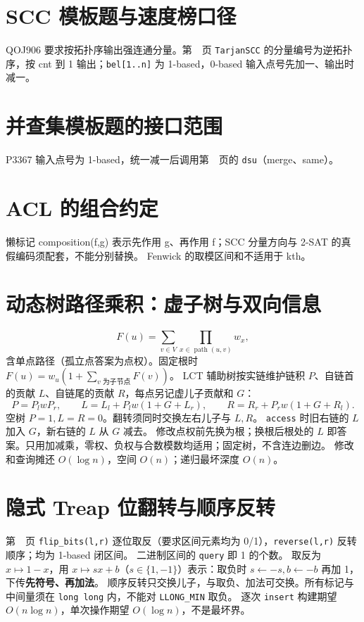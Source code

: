 \section{SCC 模板题与速度榜口径}\label{knowledge-scc-template}
QOJ906 要求按拓扑序输出强连通分量。第~\pageref{compact-TarjanSCC}~页 \texttt{TarjanSCC} 的分量编号为逆拓扑序，按 cnt 到 1 输出；\texttt{bel[1..n]} 为 1-based，0-based 输入点号先加一、输出时减一。

\section{并查集模板题的接口范围}\label{knowledge-dsu-template}
P3367 输入点号为 1-based，统一减一后调用第~\pageref{compact-dsu}~页的 \texttt{dsu}（merge、same）。

\section{ACL 的组合约定}\label{knowledge-acl-compose}
懒标记 composition(f,g) 表示先作用 g、再作用 f；SCC 分量方向与 2-SAT 的真假编码须配套，不能分别替换。
Fenwick 的取模区间和不适用于 kth。

\section{动态树路径乘积：虚子树与双向信息}\label{knowledge-lct-product}
\[
F(u)=\sum_{v\in V}\prod_{x\in\operatorname{path}(u,v)}w_x,
\]
含单点路径（孤立点答案为点权）。固定根时 $F(u)=w_u(1+\sum_{v\text{ 为子节点}}F(v))$。
LCT 辅助树按实链维护链积 $P$、自链首的贡献 $L$、自链尾的贡献 $R$，每点另记虚儿子贡献和 $G$：
\[
P=P_lwP_r,\qquad
L=L_l+P_lw(1+G+L_r),\qquad
R=R_r+P_rw(1+G+R_l).
\]
空树 $P=1,L=R=0$。翻转须同时交换左右儿子与 $L,R$。
\texttt{access} 时旧右链的 $L$ 加入 $G$，新右链的 $L$ 从 $G$ 减去。
修改点权前先换为根；换根后根处的 $L$ 即答案。只用加减乘，零权、负权与合数模数均适用；固定树，不含连边删边。
修改和查询摊还 $O(\log n)$，空间 $O(n)$；递归最坏深度 $O(n)$。

\section{隐式 Treap 位翻转与顺序反转}\label{knowledge-treap-flip}
第~\pageref{compact-SequenceTreap}~页 \texttt{flip\_bits(l,r)} 逐位取反（要求区间元素均为 0/1），\texttt{reverse(l,r)} 反转顺序；均为 1-based 闭区间。
二进制区间的 \texttt{query} 即 1 的个数。
取反为 $x\mapsto1-x$，用 $x\mapsto sx+b$（$s\in\{1,-1\}$）表示：取负时 $s\gets-s,b\gets-b$ 再加 1，下传\textbf{先符号、再加法}。
顺序反转只交换儿子，与取负、加法可交换。所有标记与中间量须在 \texttt{long long} 内，不能对 \texttt{LLONG\_MIN} 取负。
逐次 \texttt{insert} 构建期望 $O(n\log n)$，单次操作期望 $O(\log n)$，不是最坏界。

